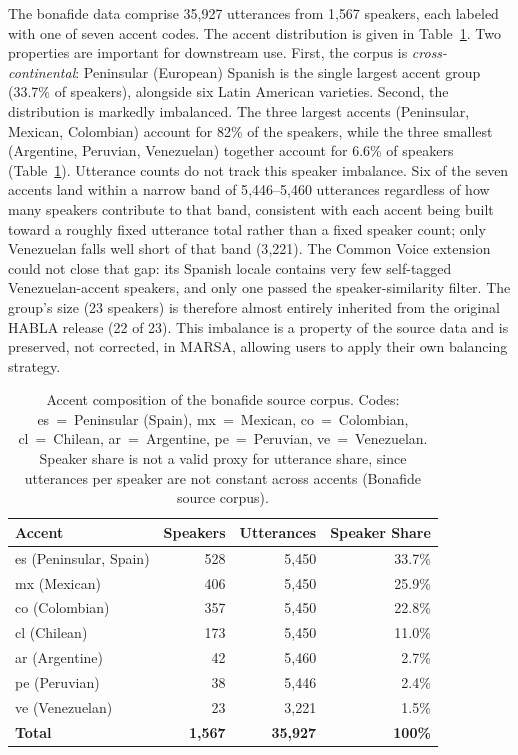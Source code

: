 \documentclass[11pt]{article}
\begin{document}
The bonafide data comprise 35{,}927 utterances from 1{,}567 speakers,
each labeled with one of seven accent codes. The accent distribution is
given in Table~\ref{tab:accents}. Two properties are important for
downstream use. First, the corpus is \emph{cross-continental}:
Peninsular (European) Spanish is the single largest accent group
(33.7\% of speakers), alongside six Latin American varieties. Second,
the distribution is markedly imbalanced. The three largest accents
(Peninsular, Mexican, Colombian) account for 82\% of the speakers, while
the three smallest (Argentine, Peruvian, Venezuelan) together account
for 6.6\% of speakers (Table~\ref{tab:accents}). Utterance counts do not
track this speaker imbalance. Six of the seven accents land within a
narrow band of 5{,}446--5{,}460 utterances regardless of how many
speakers contribute to that band, consistent with each accent being
built toward a roughly fixed utterance total rather than a fixed speaker
count; only Venezuelan falls well short of that band (3{,}221). The
Common Voice extension could not close that gap: its Spanish locale
contains very few self-tagged Venezuelan-accent speakers, and only one passed the
speaker-similarity filter. The group's size (23 speakers) is therefore
almost entirely inherited from the original HABLA release (22 of 23).
This imbalance is a property of the source data and is preserved, not
corrected, in MARSA, allowing users to apply their own balancing
strategy.

\begin{table}[t]
\centering
\caption{Accent composition of the bonafide source corpus. Codes: es~=~Peninsular
(Spain), mx~=~Mexican, co~=~Colombian, cl~=~Chilean, ar~=~Argentine,
pe~=~Peruvian, ve~=~Venezuelan. Speaker share is not a valid proxy for
utterance share, since utterances per speaker are not constant across
accents (Bonafide source corpus).}
\label{tab:accents}
\small
\begin{tabular}{lrrr}
\toprule
\textbf{Accent} & \textbf{Speakers} & \textbf{Utterances} & \textbf{Speaker Share} \\
\midrule
es (Peninsular, Spain) & 528 & 5{,}450 & 33.7\% \\
mx (Mexican)           & 406 & 5{,}450 & 25.9\% \\
co (Colombian)         & 357 & 5{,}450 & 22.8\% \\
cl (Chilean)           & 173 & 5{,}450 & 11.0\% \\
ar (Argentine)         & 42  & 5{,}460 & 2.7\% \\
pe (Peruvian)          & 38  & 5{,}446 & 2.4\% \\
ve (Venezuelan)        & 23  & 3{,}221 & 1.5\% \\
\midrule
\textbf{Total}         & \textbf{1{,}567} & \textbf{35{,}927} & \textbf{100\%} \\
\bottomrule
\end{tabular}
\end{table}
\end{document}
